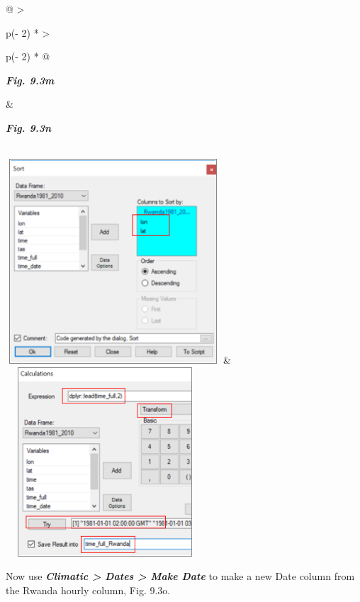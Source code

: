 \documentclass[
  letterpaper,
  DIV=11,
  numbers=noendperiod]{scrreprt}
\begin{document}
\begin{longtable}[]{@{}
  >{\raggedright\arraybackslash}p{(\columnwidth - 2\tabcolsep) * }
  >{\raggedright\arraybackslash}p{(\columnwidth - 2\tabcolsep) * }@{}}
\toprule\noalign{}
\begin{minipage}[b]{\linewidth}\raggedright
\textbf{\emph{Fig. 9.3m}}
\end{minipage} & \begin{minipage}[b]{\linewidth}\raggedright
\textbf{\emph{Fig. 9.3n}}
\end{minipage} \\
\midrule\noalign{}
\endhead
\bottomrule\noalign{}
\endlastfoot
\includegraphics[width=3.14829in,height=3.01165in]{figures/Fig9.3m.png}
&
\includegraphics[width=2.91954in,height=2.77761in]{figures/Fig9.3n.png} \\
\end{longtable}

Now use \textbf{\emph{Climatic \textgreater{} Dates \textgreater{} Make
Date}} to make a new Date column from the Rwanda hourly column, Fig.
9.3o.
\end{document}

